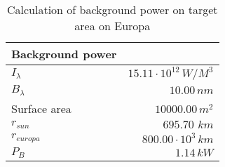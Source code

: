 \begin{table}[H]
\centering
\caption{Calculation of background power on target area on Europa}
\label{tab:background_power}
\begin{tabular}{|l|r|}\hline
    \textbf{Background power} & \\
    \hline 
    $I_\lambda$ & $15.11\cdot10^{12}\,W/M^3$ \\
    $B_\lambda$ & $10.00\,n m$ \\
    Surface area & $10000.00\, m^2$ \\
    $r_{sun}$ & $695.70\,\,km$ \\
    $r_{europa}$ & $800.00\cdot10^3\,km$ \\
    $P_B$ & $1.14\,k W$ \\
    \hline 
\end{tabular}
\end{table}
